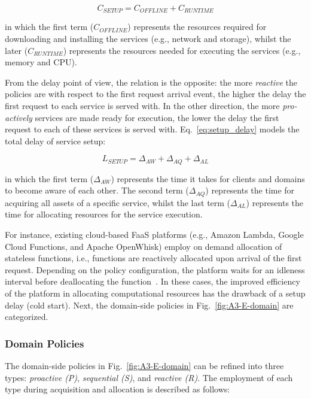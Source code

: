 \begin{equation}\label{eq:setup_cost}
C_{SETUP} = C_{OFFLINE} + C_{RUNTIME}
\end{equation}

\noindent
in which the first term ($C_{OFFLINE}$) represents the resources required for downloading and installing the services (e.g., network and storage), whilst the later ($C_{RUNTIME}$) represents the resources needed for executing the services (e.g., memory and CPU). 

From the delay point of view, the relation is the opposite: the more \textit{reactive} the policies are with respect to the first request arrival event, the higher the delay the first request to each service is served with. In the other direction, the more \textit{pro-actively} services are made ready for execution, the lower the delay the first request to each of these services is served with. Eq.~\ref{eq:setup_delay} models the total delay of service setup:

\begin{equation}\label{eq:setup_delay}
L_{SETUP} = \Delta_{AW} + \Delta_{AQ} + \Delta_{AL}
\end{equation}

\noindent
in which the first term ($\Delta_{AW}$) represents the time it takes for clients and domains to become aware of each other. The second term ($\Delta_{AQ}$) represents the time for acquiring all assets of a specific service, whilst the last term ($\Delta_{AL}$) represents the time for allocating resources for the service execution. 

For instance, existing cloud-based FaaS platforms (e.g., Amazon Lambda, Google Cloud Functions, and Apache OpenWhisk) employ on demand allocation of stateless functions, i.e., functions are reactively allocated upon arrival of the first request. Depending on the policy configuration, the platform waits for an idleness interval before deallocating the function~\cite{}. In these cases, the improved efficiency of the platform in allocating computational resources has the drawback of a setup delay (cold start). Next, the domain-side policies in Fig.~\ref{fig:A3-E-domain} are categorized.

\subsubsection*{Domain Policies} The domain-side policies in Fig.~\ref{fig:A3-E-domain} can be refined into three types: \textit{proactive (P)}, \textit{sequential (S)}, and \textit{reactive (R)}. The employment of each type during acquisition and allocation is described as follows:

